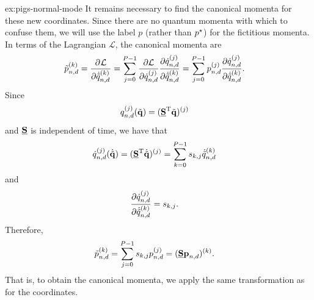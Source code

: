 \begin{DefAnswer}{ex:pigs-normal-mode}
	It remains necessary to find the canonical momenta for these new coordinates.
	Since there are no quantum momenta with which to confuse them, we will use the label $p$ (rather than ${p}^\star$) for the fictitious momenta.
	In terms of the Lagrangian $\mathcal{L}$, the canonical momenta are~\cite[35]{evans2008statistical}
	\begin{align}
		\nm{p}_{n,d}\bead{k}
		&= \dpd{\mathcal{L}}{{\dot{\nm{q}}_{n,d}\bead{k}}}
		= \sum_{j=0}^{P-1} \frac{\partial \mathcal{L}}{\partial \dot{q}_{n,d}\bead{j}} \frac{\partial \dot{q}_{n,d}\bead{j}}{\partial \dot{\nm{q}}_{n,d}\bead{k}}
		= \sum_{j=0}^{P-1} p_{n,d}\bead{j} \frac{\partial \dot{q}_{n,d}\bead{j}}{\partial \dot{\nm{q}}_{n,d}\bead{k}}.
	\end{align}
	Since
	\begin{align}
		q_{n,d}^{(j)}(\tilde{\bm{\mathbf{q}}})
		&= (\underline{\bm{\mathbf{S}}}^\mathrm{T} \tilde{\bm{\mathbf{q}}})^{(j)}
	\end{align}
	and $\underline{\bm{\mathbf{S}}}$ is independent of time, we have that
	\begin{align}
		\dot{q}_{n,d}^{(j)}(\dot{\tilde{\bm{\mathbf{q}}}})
		&= (\underline{\bm{\mathbf{S}}}^\mathrm{T} \dot{\tilde{\bm{\mathbf{q}}}})^{(j)}
		= \sum_{k=0}^{P-1} s_{k,j} \dot{\tilde{q}}_{n,d}^{(k)}
	\end{align}
	and
	\begin{align}
		\frac{\partial \dot{q}_{n,d}^{(j)}}{\partial \dot{\tilde{q}}_{n,d}^{(k)}}
		&= s_{k,j}.
	\end{align}
	Therefore,
	\begin{align}
		\tilde{p}_{n,d}^{(k)}
		&= \sum_{j=0}^{P-1} s_{k,j} p_{n,d}^{(j)}
		= (\underline{\bm{\mathbf{S}}} \bm{\mathbf{p}}_{n,d})^{(k)}.
	\end{align}
	That is, to obtain the canonical momenta, we apply the same transformation as for the coordinates.
\end{DefAnswer}

